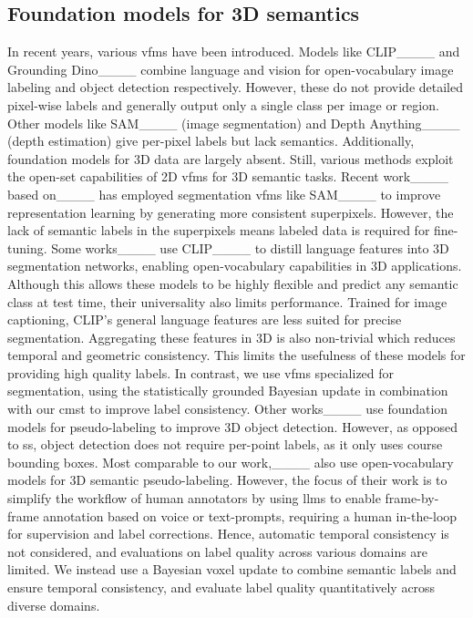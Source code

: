 \subsection{Foundation models for 3D semantics}
In recent years, various \glspl{vfm} have been introduced. Models like CLIP____ and Grounding Dino____ combine language and vision for open-vocabulary image labeling and object detection respectively. However, these do not provide detailed pixel-wise labels and generally output only a single class per image or region. Other models like SAM____ (image segmentation) and Depth Anything____ (depth estimation) give per-pixel labels but lack semantics. Additionally, foundation models for 3D data are largely absent. Still, various methods exploit the open-set capabilities of 2D \glspl{vfm} for 3D semantic tasks.
Recent work____ based on____ has employed segmentation \glspl{vfm} like SAM____ to improve representation learning by generating more consistent superpixels. However, the lack of semantic labels in the superpixels means labeled data is required for fine-tuning.
Some works____ use CLIP____ to distill language features into 3D segmentation networks, enabling open-vocabulary capabilities in 3D applications. 
Although this allows these models to be highly flexible and predict any semantic class at test time, their universality also limits performance. Trained for image captioning, CLIP’s general language features are less suited for precise segmentation. Aggregating these features in 3D is also non-trivial which reduces temporal and geometric consistency. This limits the usefulness of these models for providing high quality labels. In contrast, we use \glspl{vfm} specialized for segmentation, using the statistically grounded Bayesian update in combination with our \gls{cmst} to improve label consistency.
Other works____ use foundation models for pseudo-labeling to improve 3D object detection. However, as opposed to \gls{ss}, object detection does not require per-point labels, as it only uses course bounding boxes.
Most comparable to our work,____ also use open-vocabulary models for 3D semantic pseudo-labeling. However, the focus of their work is to simplify the workflow of human annotators by using \glspl{llm} to enable frame-by-frame annotation based on voice or text-prompts, requiring a human in-the-loop for supervision and label corrections. Hence, automatic temporal consistency is not considered, and evaluations on label quality across various domains are limited. We instead use a Bayesian voxel update to combine semantic labels and ensure temporal consistency, and evaluate label quality quantitatively across diverse domains.